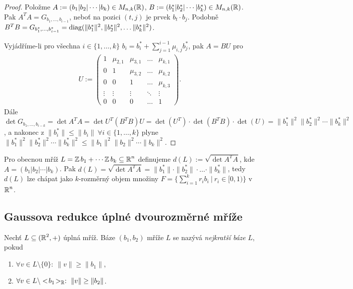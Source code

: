 \begin{proof}
Položme $A:=(b_1|b_2|\cdots|b_k)\in M_{n,k}(\operatorname{\mathbb{R}})$, $B:=(b_1^*|b_2^*|\cdots|b_k^*)\in M_{n,k}(\operatorname{\mathbb{R}})$. Pak
$A^TA=G_{b_1,\ldots,b_{i-1}}$, neboť na pozici $(t,j)$ je prvek $b_t\cdot b_j$.
Podobně $B^TB=G_{b_1^*,\ldots,b_{i-1}^*}=\operatorname{diag}(\|b_1^*\|^2,\|b_2^*\|^2,\dots\|b_k^*\|^2)$.

Vyjádříme-li pro všechna $i \in \{1,\dots,k\}$ $b_i = b_i^*+\sum_{j=1}^{i-1}\mu_{i,j}b_j^*$, pak $A=BU$ pro
\begin{align*}
    U := 
\begin{pmatrix}
1 & \mu_{2,1} & \mu_{3,1} & \dots & \mu_{k,1}\\
0 &     1     & \mu_{3,2} & \dots & \mu_{k,2}\\
0 &     0     &     1     & \dots & \mu_{k,3}\\
\vdots & \vdots & \vdots & \ddots & \vdots\\
0 &     0     &     0     & \dots & 1
\end{pmatrix}.
\end{align*}
Dále $\det G_{b_1,\ldots,b_{i-k}}=\det A^T A=\det U^T(B^T B)U=\det (U^T)\cdot \det(B^T B)\cdot \det(U)=\|b_1^*\|^2\|b_2^*\|^2\cdots\|b_k^*\|^2$, a nakonec z $\|b_i^*\|\leq\|b_i\| \ \forall i \in \{1,\dots,k\}$ plyne 
$\|b_1^*\|^2\|b_2^*\|^2\cdots\|b_k^*\|^2\leq\|b_1\|^2\|b_2\|^2\cdots\|b_k\|^2$.
\end{proof}

\begin{reminder}
Pro obecnou mříž $L=\operatorname{\mathbb{Z}} b_1+\cdots\operatorname{\mathbb{Z}} b_k \subseteq\operatorname{\mathbb{R}}^n$ definujeme $d(L):=\sqrt{\det A^T A}$, kde $A=(b_1|b_2|\cdots|b_k)$. Pak
$d(L)=\sqrt{\det A^T A}=\|b_1^*\|\cdot\|b_2^*\|\cdot\ldots\cdot\|b_k^*\|$, tedy $d(L)$ lze chápat jako $k$-rozměrný objem množiny $F=\{\sum_{i=1}^{k}r_i b_i \ | \ r_i\in [0,1)\}$ v $\operatorname{\mathbb{R}}^n$.
\end{reminder}

\subsection{Gaussova redukce úplné dvourozměrné mříže}
\begin{definition}
Nechť $L\subseteq (\operatorname{\mathbb{R}}^2,+)$ úplná mříž. Báze $(b_1,b_2)$ mříže $L$ se nazývá \emph{nejkratší báze} $L$, pokud 
\begin{enumerate}
    \item $\forall v\in L\setminus\{0\}:\ \|v\|\geq \|b_1\|$,
    \item $\forall v\in L\setminus<\!b_1\!>_{\operatorname{\mathbb{R}}}:\ \|v\|\geq\|b_2\|$.
\end{enumerate}
\end{definition}

